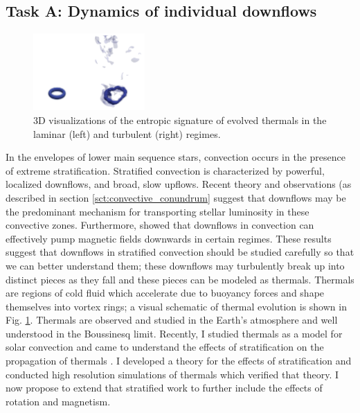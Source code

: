 \documentclass[aasms,11pt]{article}
\begin{document}
\subsection{Task A: Dynamics of individual downflows}
\begin{figure}
	\begin{center}
	\vspace{-10pt}
    \includegraphics[width=0.38\textwidth]{./figs/thermals_comparison.png}
	\vspace{-15pt}
	\end{center}
    \caption{
	3D visualizations of the entropic signature of evolved thermals in the laminar (left) and turbulent (right) regimes.
	\label{fig:thermals_comparison} }
\end{figure}

In the envelopes of lower main sequence stars, convection occurs in the presence of extreme stratification.
Stratified convection is characterized by powerful, localized downflows, and broad, slow upflows.
Recent theory and observations (as described in section \ref{sct:convective_conundrum} suggest that downflows may be the predominant mechanism for transporting stellar luminosity in these convective zones.
Furthermore, \citet{tobias&all1998} showed that downflows in convection can effectively pump magnetic fields downwards in certain regimes.
These results suggest that downflows in stratified convection should be studied carefully so that we can better understand them; these downflows may turbulently break up into distinct pieces as they fall and these pieces can be modeled as thermals.
Thermals are regions of cold fluid which accelerate due to buoyancy forces and shape themselves into vortex rings; a visual schematic of thermal evolution is shown in Fig. \ref{fig:thermals_comparison}.
Thermals are observed and studied in the Earth's atmosphere and well understood in the Boussinesq limit.
Recently, I studied thermals as a model for solar convection and came to understand the effects of stratification on the propagation of thermals \citep{andersLB2019}.
I developed a theory for the effects of stratification and conducted high resolution simulations of thermals which verified that theory.
I now propose to extend that stratified work to further include the effects of rotation and magnetism.
\end{document}
